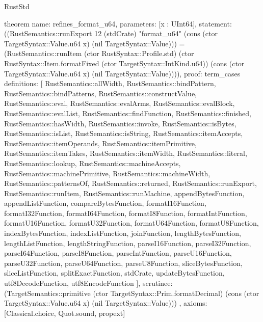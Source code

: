\begin{lexlean}{RustStd}
\begin{semanticmodule}
theorem{
  name: refines_format_u64,
  parameters: [x : UInt64],
  statement: ((RustSemantics::runExport 12 (stdCrate) "format_u64" (cons (ctor TargetSyntax::Value.u64 x) (nil TargetSyntax::Value))) = (RustSemantics::runItem (ctor RustSyntax::Profile.std) (ctor RustSyntax::Item.formatFixed (ctor TargetSyntax::IntKind.u64)) (cons (ctor TargetSyntax::Value.u64 x) (nil TargetSyntax::Value)))),
  proof: term_cases{
    definitions: [
      RustSemantics::allWidth,
      RustSemantics::bindPattern,
      RustSemantics::bindPatterns,
      RustSemantics::constructValue,
      RustSemantics::eval,
      RustSemantics::evalArms,
      RustSemantics::evalBlock,
      RustSemantics::evalList,
      RustSemantics::findFunction,
      RustSemantics::finished,
      RustSemantics::hasWidth,
      RustSemantics::invoke,
      RustSemantics::isBytes,
      RustSemantics::isList,
      RustSemantics::isString,
      RustSemantics::itemAccepts,
      RustSemantics::itemOperands,
      RustSemantics::itemPrimitive,
      RustSemantics::itemTakes,
      RustSemantics::itemWidth,
      RustSemantics::literal,
      RustSemantics::lookup,
      RustSemantics::machineAccepts,
      RustSemantics::machinePrimitive,
      RustSemantics::machineWidth,
      RustSemantics::patternsOf,
      RustSemantics::returned,
      RustSemantics::runExport,
      RustSemantics::runItem,
      RustSemantics::runMachine,
      appendBytesFunction,
      appendListFunction,
      compareBytesFunction,
      formatI16Function,
      formatI32Function,
      formatI64Function,
      formatI8Function,
      formatIntFunction,
      formatU16Function,
      formatU32Function,
      formatU64Function,
      formatU8Function,
      indexBytesFunction,
      indexListFunction,
      joinFunction,
      lengthBytesFunction,
      lengthListFunction,
      lengthStringFunction,
      parseI16Function,
      parseI32Function,
      parseI64Function,
      parseI8Function,
      parseIntFunction,
      parseU16Function,
      parseU32Function,
      parseU64Function,
      parseU8Function,
      sliceBytesFunction,
      sliceListFunction,
      splitExactFunction,
      stdCrate,
      updateBytesFunction,
      utf8DecodeFunction,
      utf8EncodeFunction
    ],
    scrutinee: (TargetSemantics::primitive (ctor TargetSyntax::Prim.formatDecimal) (cons (ctor TargetSyntax::Value.u64 x) (nil TargetSyntax::Value)))
  },
  axioms: [Classical.choice, Quot.sound, propext]
}


\end{semanticmodule}
\end{lexlean}
